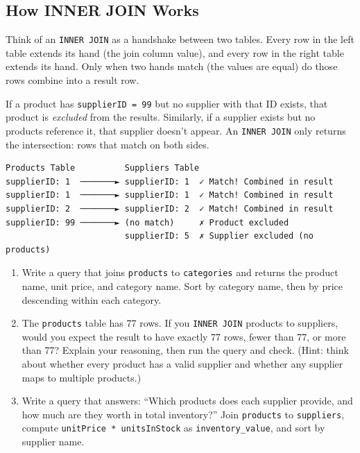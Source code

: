 \documentclass[
  letterpaper,
  DIV=11,
  numbers=noendperiod]{scrreprt}
\begin{document}
\subsection{How INNER JOIN Works}\label{how-inner-join-works}

Think of an \texttt{INNER\ JOIN} as a handshake between two tables.
Every row in the left table extends its hand (the join column value),
and every row in the right table extends its hand. Only when two hands
match (the values are equal) do those rows combine into a result row.

If a product has \texttt{supplierID\ =\ 99} but no supplier with that ID
exists, that product is \emph{excluded} from the results. Similarly, if
a supplier exists but no products reference it, that supplier doesn't
appear. An \texttt{INNER\ JOIN} only returns the intersection: rows that
match on both sides.

\begin{verbatim}
Products Table          Suppliers Table
supplierID: 1  ───────► supplierID: 1  ✓ Match! Combined in result
supplierID: 1  ───────► supplierID: 1  ✓ Match! Combined in result
supplierID: 2  ───────► supplierID: 2  ✓ Match! Combined in result
supplierID: 99 ───────► (no match)     ✗ Product excluded
                        supplierID: 5  ✗ Supplier excluded (no products)
\end{verbatim}

\begin{tcolorbox}[enhanced jigsaw, opacitybacktitle=0.6, arc=.35mm, colback=white, bottomtitle=1mm, opacityback=0, toprule=.15mm, left=2mm, colbacktitle=quarto-callout-note-color!10!white, breakable, coltitle=black, toptitle=1mm, colframe=quarto-callout-note-color-frame, bottomrule=.15mm, titlerule=0mm, title=\textcolor{quarto-callout-note-color}{\faInfo}\hspace{0.5em}{Exercises}, rightrule=.15mm, leftrule=.75mm]

\begin{enumerate}
\def\labelenumi{\arabic{enumi}.}
\item
  Write a query that joins \texttt{products} to \texttt{categories} and
  returns the product name, unit price, and category name. Sort by
  category name, then by price descending within each category.
\item
  The \texttt{products} table has 77 rows. If you \texttt{INNER\ JOIN}
  products to suppliers, would you expect the result to have exactly 77
  rows, fewer than 77, or more than 77? Explain your reasoning, then run
  the query and check. (Hint: think about whether every product has a
  valid supplier and whether any supplier maps to multiple products.)
\item
  Write a query that answers: ``Which products does each supplier
  provide, and how much are they worth in total inventory?'' Join
  \texttt{products} to \texttt{suppliers}, compute
  \texttt{unitPrice\ *\ unitsInStock} as \texttt{inventory\_value}, and
  sort by supplier name.
\end{enumerate}

\end{tcolorbox}
\end{document}
